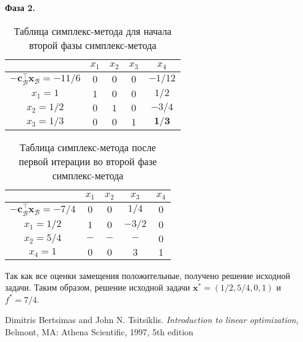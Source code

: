 \documentclass[12pt]{article}
\newcommand{\bx}{\mathbf{x}}
\begin{document}
\textbf{Фаза 2.}

\begin{table}[!ht]
\centering
\caption{Таблица симплекс-метода для начала второй фазы симплекс-метода}
\begin{tabular}{|c|cccc|}
\hline
& $x_1$ & $x_2$ & $x_3$ & $x_4$\\
\hline
$-\mathbf{c}_{\mathcal{B}}^{\top}\bx_{\mathcal{B}} = -11/6$ & $0$ & $0$ & $0$ & $-1/12$ \\
\hline
$x_1 = 1$ & $1$ & $0$ & $0$ & $1/2$ \\
$x_2 = 1/2$ & $0$ & $1$ & $0$ & $-3/4$ \\
$x_3 = 1/3$ & $0$ & $0$ & $1$ & $\mathbf{1/3}$\\
\hline
\end{tabular}
\label{tab::simplex_3_phase2_0}
\end{table}

\begin{table}[!ht]
\centering
\caption{Таблица симплекс-метода после первой итерации во второй фазе симплекс-метода}
\begin{tabular}{|c|cccc|}
\hline
& $x_1$ & $x_2$ & $x_3$ & $x_4$\\
\hline
$-\mathbf{c}_{\mathcal{B}}^{\top}\bx_{\mathcal{B}} = -7/4$ & $0$ & $0$ & $1/4$ & $0$ \\
\hline
$x_1 = 1/2$ & $1$ & $0$ & $-3/2$ & $0$ \\
$x_2 = 5/4$ & $-$ & $-$ & $-$ & $0$ \\
$x_4 = 1$ & $0$ & $0$ & $3$ & $1$\\
\hline
\end{tabular}
\label{tab::simplex_3_phase2_1}
\end{table}

Так как все оценки замещения положительные, получено решение исходной задачи.
Таким образом, решение исходной задачи $\bx^* = (1/2, 5/4, 0, 1)$ и $f^* = 7/4$.


\begin{thebibliography}{9}

Dimitris Bertsimas and John N. Tsitsiklis. \emph{Introduction to linear optimization}, Belmont, MA: Athena Scientific, 1997, 5th edition

\end{thebibliography}
\end{document}
